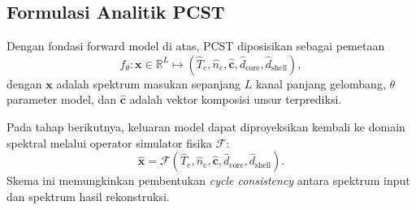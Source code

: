 \subsection{Formulasi Analitik PCST}
Dengan fondasi forward model di atas, PCST diposisikan sebagai pemetaan
\begin{equation}
f_\theta:\mathbf{x}\in\mathbb{R}^{L}\mapsto
\left(\hat{T}_e,\hat{n}_e,\hat{\mathbf{c}},\hat{d}_{\mathrm{core}},\hat{d}_{\mathrm{shell}}\right),
\end{equation}
dengan $\mathbf{x}$ adalah spektrum masukan sepanjang $L$ kanal panjang gelombang, $\theta$ parameter model, dan $\hat{\mathbf{c}}$ adalah vektor komposisi unsur terprediksi.

Pada tahap berikutnya, keluaran model dapat diproyeksikan kembali ke domain spektral melalui operator simulator fisika $\mathcal{F}$:
\begin{equation}
\hat{\mathbf{x}} = \mathcal{F}\!\left(\hat{T}_e,\hat{n}_e,\hat{\mathbf{c}},\hat{d}_{\mathrm{core}},\hat{d}_{\mathrm{shell}}\right).
\end{equation}
Skema ini memungkinkan pembentukan \textit{cycle consistency} antara spektrum input dan spektrum hasil rekonstruksi.


